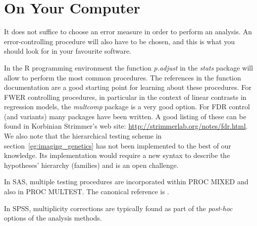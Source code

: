 \documentclass[draft,12pt]{article}
\begin{document}
\appendix

\section{\label{sec:on_your_pc} On Your Computer}
It does not suffice to choose an error measure in order to perform an analysis. An error-controlling procedure will also have to be chosen, and this is what you should look for in your favourite software. 

In the R programming environment \citep{r_development_core_team_r:_2011} the function \emph{p.adjust} in the \emph{stats} package will allow to perform the most common procedures. The references in the function documentation are a good starting point for learning about these procedures. 
For FWER controlling procedures, in particular in the context of linear contrasts in regression models, the \emph{multcomp} package is a very good option. 
For FDR control (and variants) many packages have been written. A good listing of these can be found in Korbinian Strimmer's web site: \url{http://strimmerlab.org/notes/fdr.html}. 
We also note that the hierarchical testing scheme in section~\ref{eg:imaging_genetics} has not been implemented to the best of our knowledge. Its implementation would require a new syntax to describe the hypotheses' hierarchy (families) and is an open challenge. 

In SAS, multiple testing procedures are incorporated within PROC MIXED and also in PROC MULTEST.  The canonical reference is \citet{westfall_multiple_2011}. 

In SPSS, multiplicity corrections are typically found as part of the \emph{post-hoc} options of the analysis methods.





\end{document}
